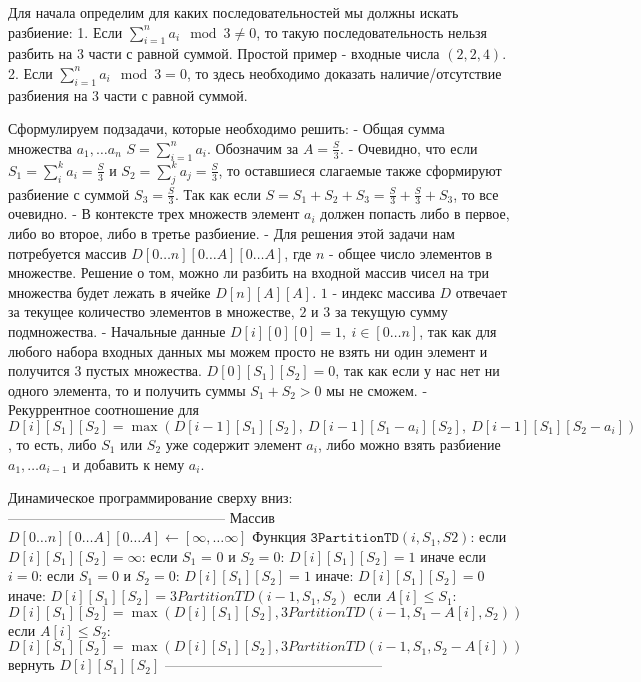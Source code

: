 Для начала определим для каких последовательностей мы должны искать разбиение:
1. Если $\sum_{i=1}^n a_i \mod 3 \neq 0$, то такую последовательность нельзя разбить на $3$ части с равной суммой. Простой пример - входные числа $(2, 2, 4)$.
2. Если $\sum_{i=1}^n a_i \mod 3 = 0$, то здесь необходимо доказать наличие/отсутствие разбиения на $3$ части с равной суммой.

Сформулируем подзадачи, которые необходимо решить:
- Общая сумма множества ${a_1, \ldots a_n}$ $S=\sum_{i=1}^n a_i$. Обозначим за $\displaystyle{A = \frac{S}{3}}$.
- Очевидно, что если $\displaystyle{S_1 = \sum_{i}^k a_i = \frac{S}{3}}$ и $\displaystyle{S_2 = \sum_{j}^k a_j = \frac{S}{3}}$, то оставшиеся слагаемые также сформируют разбиение с суммой $\displaystyle{S_3 = \frac{S}{3}}$. Так как если $\displaystyle{S = S_1 + S_2 + S_3 = \frac{S}{3} + \frac{S}{3} + S_3}$, то все очевидно.
- В контексте трех множеств элемент $a_i$ должен попасть либо в первое, либо во второе, либо в третье разбиение. 
- Для решения этой задачи нам потребуется массив $D[0 \ldots n][0 \ldots A][0 \ldots A]$, где $n$ - общее число элементов в множестве. Решение о том, можно ли разбить на входной массив чисел на три множества будет лежать в ячейке $D[n][A][A]$. $1$ - индекс массива $D$ отвечает за текущее количество элементов в множестве, $2$ и $3$ за текущую сумму подмножества.
- Начальные данные $D[i][0][0] = 1,\: i \in [0 \ldots n]$, так как для любого набора входных данных мы можем просто не взять ни один элемент и получится $3$ пустых множества.
$D[0][S_1][S_2] = 0$, так как если у нас нет ни одного элемента, то и получить суммы $S_1 + S_2 > 0$ мы не сможем.
- Рекуррентное соотношение для $D[i][S_1][S_2] = \max\left(D[i - 1][S_1][S_2], \: D[i - 1][S_1 - a_i][S_2], \: D[i - 1][S_1][S_2 - a_i]\right)$, то есть, либо $S_1$ или $S_2$ уже содержит элемент $a_i$, либо можно взять разбиение $a_1, \ldots a_{i - 1}$ и добавить к нему $a_i$.

Динамическое программирование сверху вниз:
-----------------------------------------------
Массив $D[0 \ldots n][0 \ldots A][0 \ldots A] \leftarrow [\infty, \ldots \infty]$
Функция $\texttt{3PartitionTD}(i, S_1, S2)$:
если $D[i][S_1][S_2] = \infty$:
    если $S_1$ = 0 и $S_2 = 0$:
        $D[i][S_1][S_2] = 1$
    иначе если $i = 0$:
        если $S_1 = 0$ и $S_2 = 0$:
            $D[i][S_1][S_2] = 1$
        иначе:
            $D[i][S_1][S_2] = 0$
    иначе:
        $D[i][S_1][S_2] = 3PartitionTD(i - 1, S_1, S_2)$
        если $A[i] \leq S_1$:
            $D[i][S_1][S_2] = \max\left(D[i][S_1][S_2], 3PartitionTD(i - 1, S_1 - A[i], S_2)\right)$
        если $A[i] \leq S_2$:
            $D[i][S_1][S_2] = \max\left(D[i][S_1][S_2], 3PartitionTD(i - 1, S_1, S_2 - A[i])\right)$
вернуть $D[i][S_1][S_2]$
-----------------------------------------------

